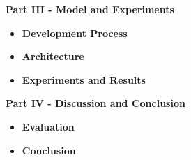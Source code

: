\vspace{0.5cm}\noindent
\begin{minipage}{\linewidth}
    \textbf{Part III - Model and Experiments}
    \begin{itemize}
        \item\textbf{Development Process} 
        \item\textbf{Architecture} 
        \item\textbf{Experiments and Results} 
    \end{itemize}
\end{minipage}

\vspace{0.5cm}\noindent
\begin{minipage}{\linewidth}
    \textbf{Part IV - Discussion and Conclusion}
    \begin{itemize}
        \item\textbf{Evaluation} 
        \item\textbf{Conclusion} 
    \end{itemize}
\end{minipage}